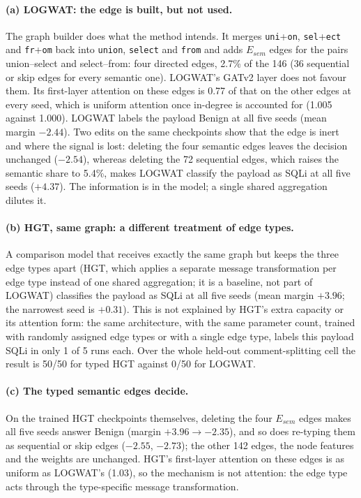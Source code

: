 \paragraph{(a) LOGWAT: the edge is built, but not used.}
The graph builder does what the method intends. It merges \texttt{uni}+\texttt{on}, \texttt{sel}+\texttt{ect} and \texttt{fr}+\texttt{om} back into \texttt{union}, \texttt{select} and \texttt{from} and adds $E_{sem}$ edges for the pairs union--select and select--from: four directed edges, 2.7\% of the 146 (36 sequential or skip edges for every semantic one). LOGWAT's GATv2 layer does not favour them. Its first-layer attention on these edges is 0.77 of that on the other edges at every seed, which is uniform attention once in-degree is accounted for (1.005 against 1.000). LOGWAT labels the payload Benign at all five seeds (mean margin $-2.44$). Two edits on the same checkpoints show that the edge is inert and where the signal is lost: deleting the four semantic edges leaves the decision unchanged ($-2.54$), whereas deleting the 72 sequential edges, which raises the semantic share to 5.4\%, makes LOGWAT classify the payload as SQLi at all five seeds ($+4.37$). The information is in the model; a single shared aggregation dilutes it.

\paragraph{(b) HGT, same graph: a different treatment of edge types.}
A comparison model that receives exactly the same graph but keeps the three edge types apart (HGT, which applies a separate message transformation per edge type instead of one shared aggregation; it is a baseline, not part of LOGWAT) classifies the payload as SQLi at all five seeds (mean margin $+3.96$; the narrowest seed is $+0.31$). This is not explained by HGT's extra capacity or its attention form: the same architecture, with the same parameter count, trained with randomly assigned edge types or with a single edge type, labels this payload SQLi in only 1 of 5 runs each. Over the whole held-out comment-splitting cell the result is 50/50 for typed HGT against 0/50 for LOGWAT.

\paragraph{(c) The typed semantic edges decide.}
On the trained HGT checkpoints themselves, deleting the four $E_{sem}$ edges makes all five seeds answer Benign (margin $+3.96 \rightarrow -2.35$), and so does re-typing them as sequential or skip edges ($-2.55$, $-2.73$); the other 142 edges, the node features and the weights are unchanged. HGT's first-layer attention on these edges is as uniform as LOGWAT's (1.03), so the mechanism is not attention: the edge type acts through the type-specific message transformation.

